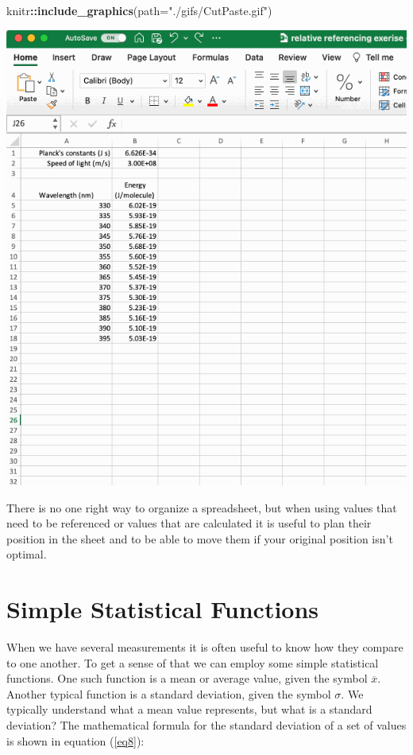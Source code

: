\documentclass[
]{book}
\newenvironment{Shaded}{\begin{snugshade}}{\end{snugshade}}
\newcommand{\AttributeTok}[1]{\textcolor[rgb]{0.13,0.29,0.53}{#1}}
\newcommand{\FunctionTok}[1]{\textcolor[rgb]{0.13,0.29,0.53}{\textbf{#1}}}
\newcommand{\NormalTok}[1]{#1}
\newcommand{\SpecialCharTok}[1]{\textcolor[rgb]{0.81,0.36,0.00}{\textbf{#1}}}
\newcommand{\StringTok}[1]{\textcolor[rgb]{0.31,0.60,0.02}{#1}}
\begin{document}
\begin{Shaded}
\begin{Highlighting}[]
\NormalTok{knitr}\SpecialCharTok{::}\FunctionTok{include\_graphics}\NormalTok{(}\AttributeTok{path=}\StringTok{"./gifs/CutPaste.gif"}\NormalTok{)}
\end{Highlighting}
\end{Shaded}

\includegraphics{./gifs/CutPaste.gif}

There is no one right way to organize a spreadsheet, but when using values that need to be referenced or values that are calculated it is useful to plan their position in the sheet and to be able to move them if your original position isn't optimal.

\hypertarget{simple-statistical-functions}{%
\section{Simple Statistical Functions}\label{simple-statistical-functions}}

When we have several measurements it is often useful to know how they compare to one another. To get a sense of that we can employ some simple statistical functions. One such function is a mean or average value, given the symbol \(\overline{x}\). Another typical function is a standard deviation, given the symbol \(\sigma\). We typically understand what a mean value represents, but what is a standard deviation? The mathematical formula for the standard deviation of a set of values is shown in equation (\ref{eq8}):
\end{document}
